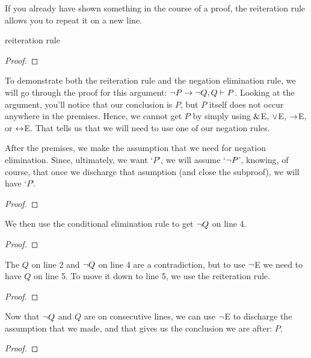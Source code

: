  If you already have shown something in the course of a proof, the reiteration rule allows you to repeat it on a new line.  

\begin{factboxy}{reiteration rule}
\begin{proof}
	 
\end{proof}
\end{factboxy}

To demonstrate both the reiteration rule and the negation elimination rule, we will go through the proof for this argument: ${\neg} P \rightarrow {\neg} Q, Q \vdash P$. Looking at the argument, you'll notice that our conclusion is $P$, but $P$ itself does not occur anywhere in the premises. Hence, we cannot get $P$ by simply using $\mathbin{\&}$E, $\vee$E, $\rightarrow$E, or $\leftrightarrow$E. That tells us that we will need to use one of our negation rules.

After the premises, we make the assumption that we need for negation elimination. Since, ultimately, we want `$P$', we will assume `${\neg} P$', knowing, of course, that once we discharge that asumption (and close the subproof), we will have `$P$'.

\begin{proof}
	 \pr{}	
	 \pr{}
	\open
		\as{}
\end{proof}
We then use the conditional elimination rule to get ${\neg} Q$ on line 4. 
\begin{proof}
	 \pr{}	
	 \pr{}
	\open
		\as{}
\end{proof}
The $Q$ on line 2 and ${\neg} Q$ on line 4 are a contradiction, but to use ${\neg}$E we need to have $Q$ on line 5. To move it down to line 5, we use the reiteration rule. 

\begin{proof}
	 \pr{}	
	 \pr{}
	\open
		\as{}
\end{proof}
Now that ${\neg} Q$ and $Q$ are on consecutive lines, we can use ${\neg}$E to discharge the assumption that we made, and that gives us the conclusion we are after: $P$.

\begin{proof}
	 \pr{}	
	 \pr{}
	\open
		\as{}
	\close
\end{proof}

